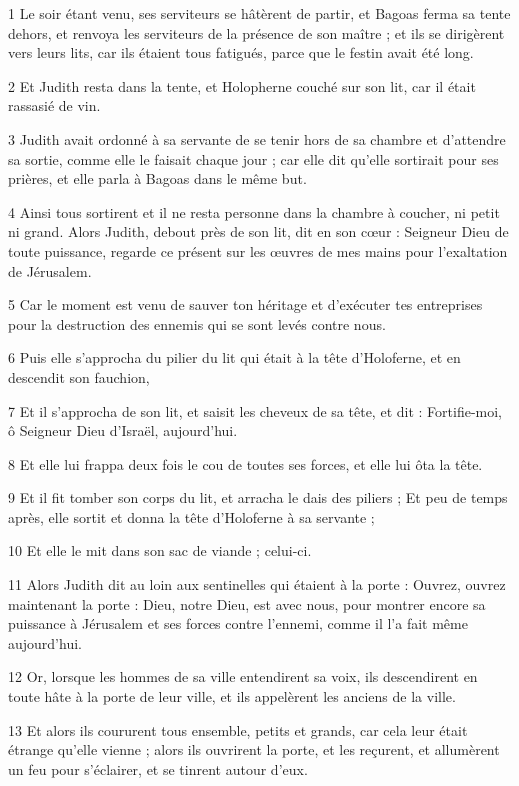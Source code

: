\par 1 Le soir étant venu, ses serviteurs se hâtèrent de partir, et Bagoas ferma sa tente dehors, et renvoya les serviteurs de la présence de son maître ; et ils se dirigèrent vers leurs lits, car ils étaient tous fatigués, parce que le festin avait été long.
\par 2 Et Judith resta dans la tente, et Holopherne couché sur son lit, car il était rassasié de vin.
\par 3 Judith avait ordonné à sa servante de se tenir hors de sa chambre et d'attendre sa sortie, comme elle le faisait chaque jour ; car elle dit qu'elle sortirait pour ses prières, et elle parla à Bagoas dans le même but.
\par 4 Ainsi tous sortirent et il ne resta personne dans la chambre à coucher, ni petit ni grand. Alors Judith, debout près de son lit, dit en son cœur : Seigneur Dieu de toute puissance, regarde ce présent sur les œuvres de mes mains pour l'exaltation de Jérusalem.
\par 5 Car le moment est venu de sauver ton héritage et d'exécuter tes entreprises pour la destruction des ennemis qui se sont levés contre nous.
\par 6 Puis elle s'approcha du pilier du lit qui était à la tête d'Holoferne, et en descendit son fauchion,
\par 7 Et il s'approcha de son lit, et saisit les cheveux de sa tête, et dit : Fortifie-moi, ô Seigneur Dieu d'Israël, aujourd'hui.
\par 8 Et elle lui frappa deux fois le cou de toutes ses forces, et elle lui ôta la tête.
\par 9 Et il fit tomber son corps du lit, et arracha le dais des piliers ; Et peu de temps après, elle sortit et donna la tête d'Holoferne à sa servante ;
\par 10 Et elle le mit dans son sac de viande ; celui-ci.
\par 11 Alors Judith dit au loin aux sentinelles qui étaient à la porte : Ouvrez, ouvrez maintenant la porte : Dieu, notre Dieu, est avec nous, pour montrer encore sa puissance à Jérusalem et ses forces contre l'ennemi, comme il l'a fait même aujourd'hui.
\par 12 Or, lorsque les hommes de sa ville entendirent sa voix, ils descendirent en toute hâte à la porte de leur ville, et ils appelèrent les anciens de la ville.
\par 13 Et alors ils coururent tous ensemble, petits et grands, car cela leur était étrange qu'elle vienne ; alors ils ouvrirent la porte, et les reçurent, et allumèrent un feu pour s'éclairer, et se tinrent autour d'eux.
